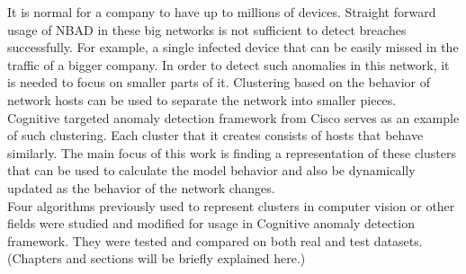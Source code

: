 \documentclass[thesis=B,english]{FITthesis}[2012/10/20]
\begin{document}
It is normal for a company to have up to millions of devices.
Straight forward usage of NBAD in these big networks is not sufficient to detect breaches successfully.
For example, a single infected device that can be easily missed in the traffic of a bigger company.
In order to detect such anomalies in this network, it is needed to focus on smaller parts of it.
Clustering based on the behavior of network hosts can be used to separate the network into smaller pieces. \\

Cognitive targeted anomaly detection framework from Cisco serves as an example of such clustering.
Each cluster that it creates consists of hosts that behave similarly.
The main focus of this work is finding a representation of these clusters that can be used to calculate the model behavior and also be dynamically updated as the behavior of the network changes. \\ 
                                           
Four algorithms previously used to represent clusters in computer vision or other fields were studied and modified for usage in Cognitive anomaly detection framework.
They were tested and compared on both real and test datasets. \\

(Chapters and sections will be briefly explained here.)

%                                                                                  
                                                                                    
\end{document}
